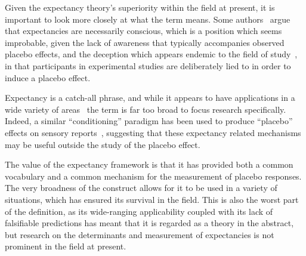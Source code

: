 Given the expectancy theory's superiority within the field at present, it is important to look more closely at what the term means. Some authors~\cite{Stewart-Williams2004a}  argue that expectancies are necessarily conscious, which is a position which seems improbable, given the lack of awareness that typically accompanies observed placebo effects, and the deception which appears endemic to the field of study~\cite{Miller2008a,Miller2008}, in that participants in experimental studies are deliberately lied to in order to induce a placebo effect. 

Expectancy is a catch-all phrase, and while it appears to have applications in a wide variety of areas~\cite{Montgomery2007} the term is far too broad to focus research specifically. Indeed, a similar ``conditioning'' paradigm has been used to produce ``placebo'' effects on sensory reports~\cite{Sterzer2008}, suggesting that these expectancy related mechanisms may be useful outside the study of the placebo effect. 








The value of the expectancy framework is that it has provided both a common vocabulary and a common mechanism for the measurement of placebo responses. The very broadness of the construct allows for it to be used in a variety of situations, which has ensured its survival in the field. This is also the worst part of the definition, as its wide-ranging applicability coupled with its lack of falsifiable predictions has meant that it is regarded as a theory in the abstract, but research on the determinants and measurement of expectancies is not prominent in the field at present.

